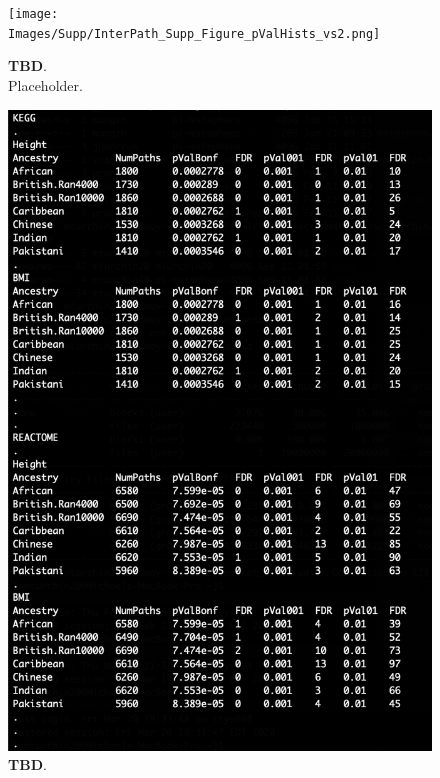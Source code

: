 \documentclass[12pt, a4paper]{article}
\begin{document}
\begin{figure}[htbp]
\centering
\texttt{[image: Images/Supp/InterPath\_Supp\_Figure\_pValHists\_vs2.png]}
\caption[TBD]{\textbf{TBD}. \\ Placeholder.}
\label{InterPath-Supp-Figure-10perms-pValHists}
\end{figure}
\clearpage

\begin{figure}[htbp]
\centering
\includegraphics[scale=1.5]{Images/Supp/InterPath_Supp_Figure_FDRs_AllPops_vs1.png}
\caption[TBD]{\textbf{TBD}. }
\label{InterPath-Supp-Figure-FDR-AllPops}
\end{figure}
\clearpage
\end{document}
